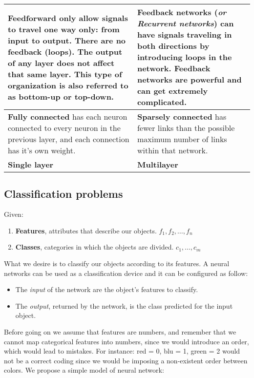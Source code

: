 \begin{table}[H]
	\centering
	\begin{tabular}{| p{7.5cm} | p{7.5cm} |}
		\hline
		\textbf{Feedforward only} allow signals to travel one way only: from input to output. There are no feedback (loops). The output of any layer does not affect that same layer. This type of organization is also referred to as bottom-up or top-down. & \textbf{Feedback networks} (\textit{or Recurrent networks}) can have signals traveling in both directions by introducing loops in the network. Feedback networks are powerful and can get extremely complicated.\\
		\hline
		\textbf{Fully connected} has each neuron connected to every neuron in the previous layer, and each connection has it's own weight. & \textbf{Sparsely connected} has fewer links than the possible maximum number of links within that network.  \\
		\hline
		\textbf{Single layer} & \textbf{Multilayer}\\
		\hline
	\end{tabular}
\end{table} 


\subsection{Classification problems}
Given:
\begin{enumerate}
	\item \textbf{Features}, attributes that describe our objects. $f_1,f_2,\dots,f_n$
	\item \textbf{Classes}, categories in which the objects are divided. $c_1,\dots,c_m$
\end{enumerate}
What we desire is to classify our objects according to its features. A neural networks can be used as a classification device and it can be configured as follow:
\begin{itemize}
	\item The \textit{input} of the network are the object's features to classify.
	\item The \textit{output}, returned by the network, is the class predicted for the input object.
\end{itemize}
Before going on we assume that features are numbers, and remember that we cannot map categorical features into numbers, since we would introduce an order, which would lead to mistakes. For instance: red = 0, blu = 1, green = 2 would not be a correct coding since we would be imposing a non-existent order between colors. We propose a simple model of neural network:

